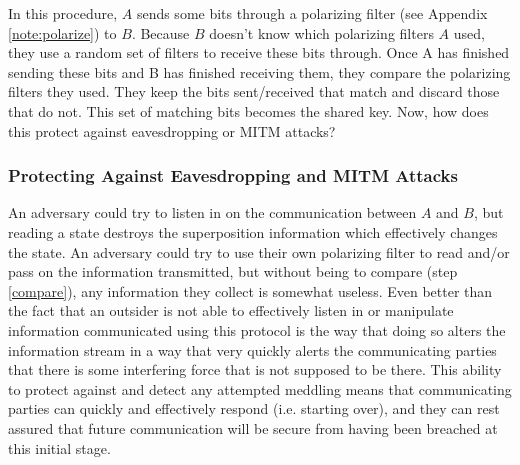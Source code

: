     In this procedure, $A$ sends some bits through a polarizing filter (see Appendix \ref{note:polarize}) to $B$. Because $B$ doesn't know which polarizing filters $A$ used, they use a random set of filters to receive these bits through. Once A has finished sending these bits and B has finished receiving them, they compare the polarizing filters they used. They keep the bits sent/received that match and discard those that do not. This set of matching bits becomes the shared key. Now, how does this protect against eavesdropping or MITM attacks?

    \subsubsection{Protecting Against Eavesdropping and MITM Attacks}
    An adversary could try to listen in on the communication between $A$ and $B$, but reading a state destroys the superposition information which effectively changes the state. An adversary could try to use their own polarizing filter to read and/or pass on the information transmitted, but without being to compare (step \ref{compare}), any information they collect is somewhat useless. Even better than the fact that an outsider is not able to effectively listen in or manipulate information communicated using this protocol is the way that doing so alters the information stream in a way that very quickly alerts the communicating parties that there is some interfering force that is not supposed to be there. This ability to protect against and detect any attempted meddling means that communicating parties can quickly and effectively respond (i.e. starting over), and they can rest assured that future communication will be secure from having been breached at this initial stage. 